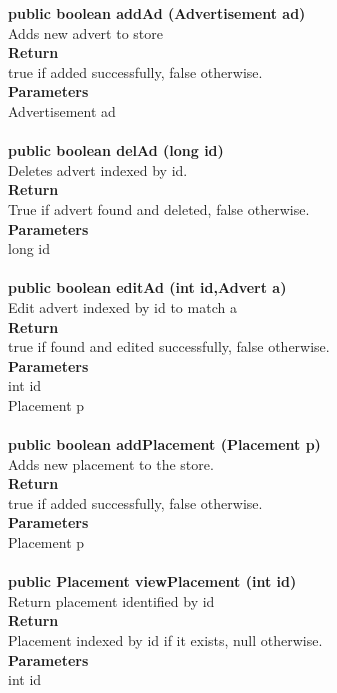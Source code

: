 \documentclass{l3deliverable}
\begin{document}
\textbf{public boolean addAd (Advertisement ad)}\\
Adds new advert to store\\
\textbf{Return}\\
true if added successfully, false otherwise.\\
\textbf{Parameters}\\
Advertisement ad\\
\\

\textbf{public boolean delAd (long id)}\\
Deletes advert indexed by id.\\
\textbf{Return}\\
True if advert found and deleted, false otherwise.\\
\textbf{Parameters}\\
long id\\
\\

\textbf{public boolean editAd (int id,Advert a)}\\
Edit advert indexed by id to match a \\
\textbf{Return}\\
true if found and edited successfully, false otherwise.\\
\textbf{Parameters}\\
int id\\
Placement p\\
\\


\textbf{public boolean addPlacement (Placement p)}\\
Adds new placement to the store.\\
\textbf{Return}\\
true if added successfully, false otherwise.\\
\textbf{Parameters}\\
Placement p\\
\\

\textbf{public Placement viewPlacement (int id)}\\
Return placement identified by id\\
\textbf{Return}\\
Placement indexed by id if it exists, null otherwise.\\
\textbf{Parameters}\\
int id\\
\\
\end{document}
